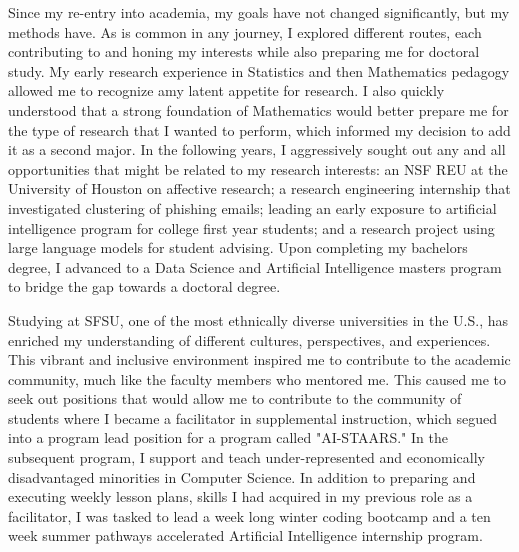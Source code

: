 \documentclass[12pt]{article}
\begin{document}
Since my re-entry into academia, my goals have not changed significantly, but my methods have. As is common in any journey, I explored
different routes, each contributing to and honing my interests while also preparing me for doctoral study. My early research experience in
Statistics and then Mathematics pedagogy allowed me to recognize amy latent appetite for research. I also quickly understood that a strong
foundation of Mathematics would better prepare me for the type of research that I wanted to perform, which informed my decision to add it as
a second major. In the following years, I aggressively sought out any and all opportunities that might be related to my research interests:
an NSF REU at the University of Houston on affective research; a research engineering internship that investigated clustering of phishing
emails; leading an early exposure to artificial intelligence program for college first year students; and a research project using large
language models for student advising. Upon completing my bachelors degree, I advanced to a Data Science and Artificial Intelligence masters
program to bridge the gap towards a doctoral degree.

Studying at SFSU, one of the most ethnically diverse universities in the U.S., has enriched my understanding of different cultures,
perspectives, and experiences. This vibrant and inclusive environment inspired me to contribute to the academic community, much like the
faculty members who mentored me. This caused me to seek out positions that would allow me to contribute to the community of students where I
became a facilitator in supplemental instruction, which segued into a program lead position for a program called "AI-STAARS." In the
subsequent program, I support and teach under-represented and economically disadvantaged minorities in Computer Science.  In addition to
preparing and executing weekly lesson plans, skills I had acquired in my previous role as a facilitator, I was tasked to lead a week
long winter coding bootcamp and a ten week summer pathways accelerated Artificial Intelligence internship program.
\end{document}
